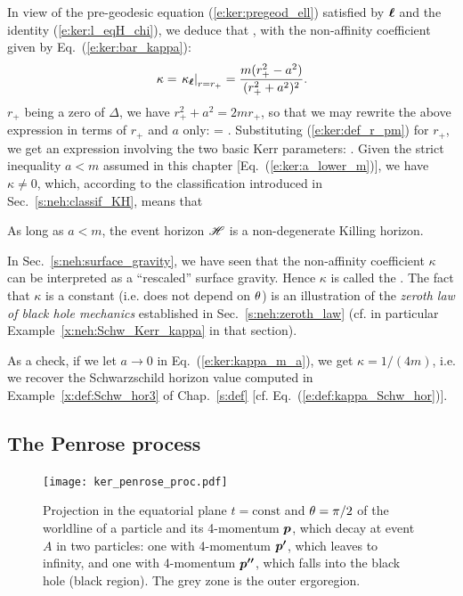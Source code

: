 In view of the pre-geodesic equation (\ref{e:ker:pregeod_ell}) satisfied
by $\bm{\ell}$ and the identity (\ref{e:ker:l_eqH_chi}), we deduce that
\be \label{e:ker:pregeod_chi}
    \encadre{ \wnab_{\w{\chi}}\, \w{\chi} \equalH \kappa \, \w{\chi} },
\ee
with the non-affinity coefficient given by Eq.~(\ref{e:ker:bar_kappa}):
\[
    \kappa = \left. \kappa_{\bm{\ell}} \right| _{r=r_+} = \frac{m(r_+^2-a^2)}{(r_+^2+a^2)^2} .
\]
$r_+$ being a zero of $\Delta$, we have $r_+^2 + a^2 = 2 m r_+$, so that we may
rewrite the above expression in terms of $r_+$ and $a$ only:
\be
    \kappa =  .
\ee
Substituting (\ref{e:ker:def_r_pm}) for $r_+$, we get an expression involving
the two basic Kerr parameters:
\be \label{e:ker:kappa_m_a}
     .
\ee
Given the strict inequality $a<m$ assumed in this chapter [Eq.~(\ref{e:ker:a_lower_m})],
we have $\kappa\not=0$, which, according to the classification introduced in
Sec.~\ref{s:neh:classif_KH}, means that
\begin{greybox}
As long as $a<m$, the event horizon $\mathscr{H}$ is a non-degenerate Killing horizon.
\end{greybox}
In Sec.~\ref{s:neh:surface_gravity}, we have seen that the non-affinity coefficient
$\kappa$ can be interpreted as a ``rescaled'' surface gravity. Hence $\kappa$
is called
the .
The fact that $\kappa$ is a constant (i.e. does not depend on $\theta$) is
an illustration of the \emph{zeroth law of black hole mechanics}
established in Sec.~\ref{s:neh:zeroth_law} (cf. in particular
Example~\ref{x:neh:Schw_Kerr_kappa} in that section).
\begin{remark}
As a check, if we let $a\rightarrow 0$ in Eq.~(\ref{e:ker:kappa_m_a}), we get
$\kappa = 1/(4m)$, i.e. we recover the Schwarzschild horizon value computed in
Example~\ref{x:def:Schw_hor3} of Chap.~\ref{s:def} [cf. Eq.~(\ref{e:def:kappa_Schw_hor})].
\end{remark}

\subsection{The Penrose process} \label{s:ker:Penrose_proc}

\begin{figure}
\centerline{\texttt{[image: ker\_penrose\_proc.pdf]}}
\caption[]{\label{f:ker:penrose_proc} \footnotesize
Projection in the equatorial plane $t=\mathrm{const}$
and $\theta=\pi/2$ of the worldline of a particle and its 4-momentum $\bm{p}$,
which decay at event $A$ in two particles: one with 4-momentum
$\bm{p'}$, which leaves to infinity, and one with 4-momentum
$\bm{p''}$, which falls into the black hole (black region).
The grey zone is the outer ergoregion.
}
\end{figure}

